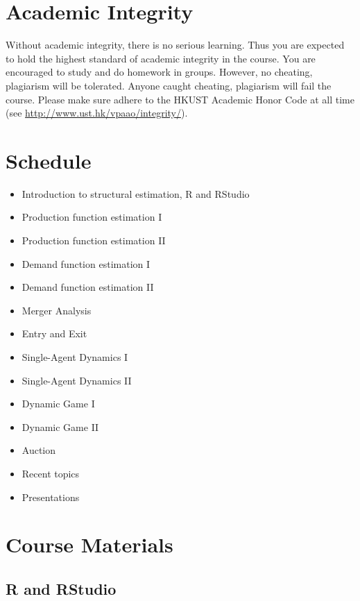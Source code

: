 \documentclass[
]{book}
\providecommand{\tightlist}{%
  \setlength{\itemsep}{0pt}\setlength{\parskip}{0pt}}
\begin{document}
\hypertarget{academic-integrity}{%
\section{Academic Integrity}\label{academic-integrity}}

Without academic integrity, there is no serious learning. Thus you are expected to hold the highest standard of academic integrity in the course. You are encouraged to study and do homework in groups. However, no cheating, plagiarism will be tolerated. Anyone caught
cheating, plagiarism will fail the course. Please make sure adhere to the HKUST Academic
Honor Code at all time (see \url{http://www.ust.hk/vpaao/integrity/}).

\hypertarget{schedule}{%
\section{Schedule}\label{schedule}}

\begin{itemize}
\tightlist
\item
  Introduction to structural estimation, R and RStudio
\item
  Production function estimation I
\item
  Production function estimation II
\item
  Demand function estimation I
\item
  Demand function estimation II
\item
  Merger Analysis
\item
  Entry and Exit
\item
  Single-Agent Dynamics I
\item
  Single-Agent Dynamics II
\item
  Dynamic Game I
\item
  Dynamic Game II
\item
  Auction
\item
  Recent topics
\item
  Presentations
\end{itemize}

\hypertarget{course-materials}{%
\section{Course Materials}\label{course-materials}}

\hypertarget{r-and-rstudio}{%
\subsection{R and RStudio}\label{r-and-rstudio}}
\end{document}
